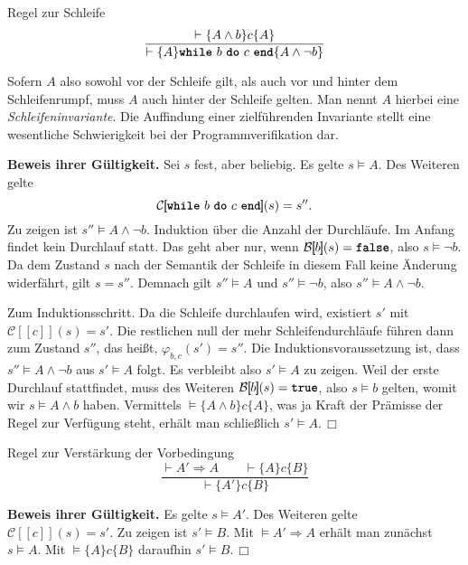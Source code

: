 \documentclass[8pt,fleqn,aspectratio=169]{beamer}
\newcommand{\strong}[1]{\textsf{\textbf{#1}}}
\renewcommand{\qedsymbol}{\ensuremath{\Box}}
\newcommand{\parspace}{\vspace{0.8em}}
\newcommand{\kw}[1]{\textbf{\texttt{#1}}}
\newcommand{\qb}[1]{[\!\![#1]\!\!]}
\newcommand{\evB}{\mathcal B}
\newcommand{\evC}{\mathcal C}
\begin{document}
\begin{frame}
\begin{block}{Regel zur Schleife}
\[\dfrac{\vdash\{A\land b\}c\{A\}}{
\vdash\{A\}\text{\kw{while} $b$ \kw{do} $c$ \kw{end}}\{A\land\lnot b\}}\]
\end{block}\pause
Sofern $A$ also sowohl vor der Schleife gilt, als auch vor und hinter
dem Schleifenrumpf, muss $A$ auch hinter der Schleife gelten. Man nennt
$A$ hierbei eine \emph{Schleifeninvariante}. Die Auffindung einer
zielführenden Invariante stellt eine wesentliche Schwierigkeit bei der
Programmverifikation dar.
\end{frame}

\begin{frame}
\strong{Beweis ihrer Gültigkeit.} Sei $s$ fest, aber beliebig.
Es gelte $s\models A$. Des Weiteren gelte
\[\evC\qb{\text{\kw{while} $b$ \kw{do} $c$ \kw{end}}}(s) = s''.\]
Zu zeigen ist $s''\models A\land\lnot b$.\pause{} Induktion über die
Anzahl der Durchläufe. Im Anfang findet kein Durchlauf statt. Das
geht aber nur, wenn $\evB\qb{b}(s)=\kw{false}$, also $s\models\lnot b$.
Da dem Zustand $s$ nach der Semantik der Schleife in diesem Fall keine Änderung
widerfährt, gilt $s=s''$. Demnach gilt $s''\models A$ und $s''\models\lnot b$,
also $s''\models A\land\lnot b$.\pause

\parspace
Zum Induktionsschritt. Da die Schleife durchlaufen wird, existiert
$s'$ mit $\evC\qb{c}(s)=s'$. Die restlichen null der mehr Schleifendurchläufe
führen dann zum Zustand $s''$, das heißt, $\varphi_{b,c}(s')=s''$.
Die Induktionsvoraussetzung ist, dass $s''\models A\land\lnot b$
aus $s'\models A$ folgt. Es verbleibt also $s'\models A$ zu zeigen.
Weil der erste Durchlauf stattfindet, muss des Weiteren $\evB\qb{b}(s)=\kw{true}$,
also $s\models b$ gelten, womit wir $s\models A\land b$ haben.
Vermittels $\models\{A\land b\}c\{A\}$, was ja Kraft der Prämisse der Regel
zur Verfügung steht, erhält man schließlich $s'\models A$.\,\qedsymbol
\end{frame}

\begin{frame}
\begin{block}{Regel zur Verstärkung der Vorbedingung}
\[\dfrac{\vdash A'\Rightarrow A\qquad\vdash\{A\}c\{B\}}{
\vdash\{A'\}c\{B\}}\]
\end{block}\pause
\strong{Beweis ihrer Gültigkeit.} Es gelte $s\models A'$.
Des Weiteren gelte $\evC\qb{c}(s)=s'$. Zu zeigen ist $s'\models B$.\pause{}
Mit $\models A'\Rightarrow A$ erhält man zunächst $s\models A$.
Mit $\models\{A\}c\{B\}$ daraufhin $s'\models B$.\,\qedsymbol
\end{frame}
\end{document}
